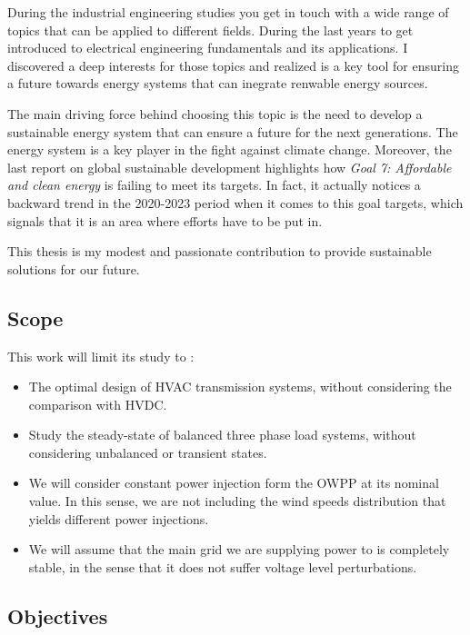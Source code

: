 \documentclass[a4paper,11pt, titlepage, twoside]{article}
\begin{document}
During the industrial engineering studies you get in touch with a wide range of topics that can be applied
to different fields. During the last years to get introduced to electrical engineering fundamentals and its 
applications. I discovered a deep interests for those topics and realized is a key tool for ensuring a future towards
energy systems that can inegrate renwable energy sources.\par

The main driving force behind choosing this topic is the need to develop a sustainable energy system that can
ensure a future for the next generations. The energy system is a key player in the fight against climate change. Moreover, the last
report on global sustainable development \cite{SustGoal7} highlights how \textit{Goal 7: Affordable and clean energy} is failing to meet its targets.
In fact, it actually notices a backward trend in the 2020-2023 period when it comes to this goal targets, which signals that it is an area where efforts
have to be put in. \par

This thesis is my modest and passionate contribution to provide sustainable solutions for our future.

\subsection{Scope}

This work will limit its study to :
\begin{itemize}
    \item The optimal design of HVAC transmission systems, without considering the comparison with HVDC.
    \item Study the steady-state of balanced three phase load systems, without considering unbalanced or transient states.
    \item We will consider constant power injection form the OWPP at its nominal value. In this sense, we are not including the wind speeds distribution that yields different 
    power injections.
    \item We will assume that the main grid we are supplying power to is completely stable, in the sense that it does not suffer voltage level perturbations.
\end{itemize}
\subsection{Objectives}\label{objectives}
\end{document}
